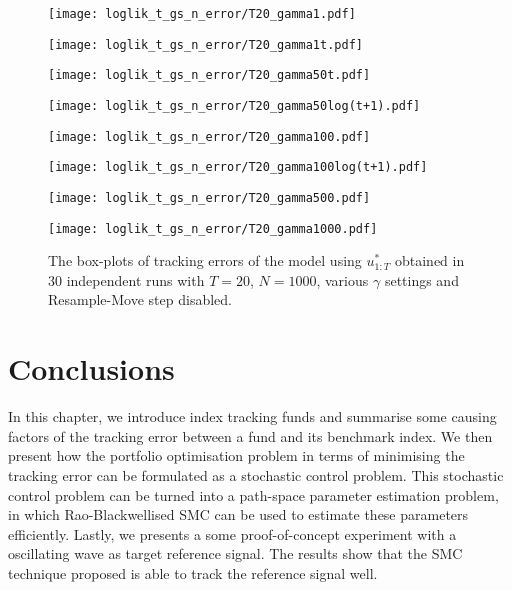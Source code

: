 \begin{figure}[!thbp]
    \centering
    \begin{minipage}{.5\textwidth}
        \centering
        \texttt{[image: loglik\_t\_gs\_n\_error/T20\_gamma1.pdf]}
    \end{minipage}%
    \begin{minipage}{0.5\textwidth}
        \centering
        \texttt{[image: loglik\_t\_gs\_n\_error/T20\_gamma1t.pdf]}
    \end{minipage}
    \begin{minipage}{0.5\textwidth}
        \centering
        \texttt{[image: loglik\_t\_gs\_n\_error/T20\_gamma50t.pdf]}
    \end{minipage}%
    \begin{minipage}{0.5\textwidth}
        \centering
        \texttt{[image: loglik\_t\_gs\_n\_error/T20\_gamma50log(t+1).pdf]}
    \end{minipage}
    \begin{minipage}{0.5\textwidth}
        \centering
        \texttt{[image: loglik\_t\_gs\_n\_error/T20\_gamma100.pdf]}
    \end{minipage}%
    \begin{minipage}{0.5\textwidth}
        \centering
        \texttt{[image: loglik\_t\_gs\_n\_error/T20\_gamma100log(t+1).pdf]}
    \end{minipage}
    \begin{minipage}{0.5\textwidth}
        \centering
        \texttt{[image: loglik\_t\_gs\_n\_error/T20\_gamma500.pdf]}
    \end{minipage}%
    \begin{minipage}{0.5\textwidth}
        \centering
        \texttt{[image: loglik\_t\_gs\_n\_error/T20\_gamma1000.pdf]}
    \end{minipage}
    \caption{The box-plots of tracking errors of the model using $u^*_{1:T}$ obtained in $30$ independent runs with $T=20$, $N=1000$, various $\gamma$ settings and Resample-Move step disabled.}
    \label{fig:error}
\end{figure}

\section{Conclusions}
In this chapter, we introduce index tracking funds and summarise some causing factors of the tracking error between a fund and its benchmark index. We then present how the portfolio optimisation problem in terms of minimising the tracking error can be formulated as a stochastic control problem. This stochastic control problem can be turned into a path-space parameter estimation problem, in which Rao-Blackwellised SMC can be used to estimate these parameters efficiently. Lastly, we presents a some proof-of-concept experiment with a oscillating wave as target reference signal. The results show that the SMC technique proposed is able to track the reference signal well.

